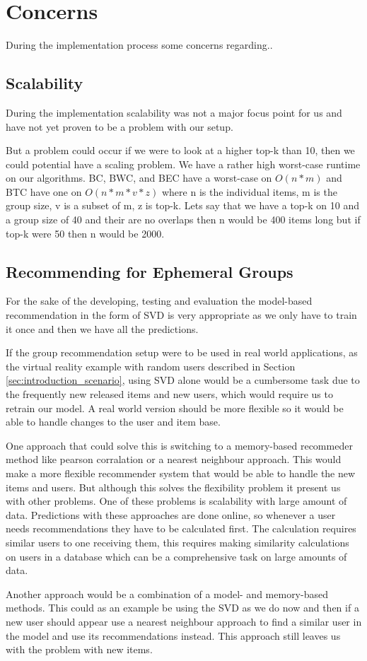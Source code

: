 \section{Concerns}
During the implementation process some concerns regarding..

\subsection{Scalability}
During the implementation scalability was not a major focus point for us and have not yet proven to be a problem with our setup. 

But a problem could occur if we were to look at a higher top-k than 10, then we could potential have a scaling problem. We have a rather high worst-case runtime on our algorithms. BC, BWC, and BEC have a worst-case on $O(n*m)$ and BTC have one on $O(n*m*v*z)$ where n is the individual items, m is the group size, v is a subset of m, z is top-k. Lets say that we have a top-k on 10 and a group size of 40 and their are no overlaps then n would be 400 items long but if top-k were 50 then n would be 2000. 

\subsection{Recommending for Ephemeral Groups}
For the sake of the developing, testing and evaluation the model-based recommendation in the form of SVD is very appropriate as we only have to train it once and then we have all the predictions. 

If the group recommendation setup were to be used in real world applications, as the virtual reality example with random users described in Section \ref{sec:introduction_scenario}, using SVD alone would be a cumbersome task due to the frequently new released items and new users, which would require us to retrain our model. A real world version should be more flexible so it would be able to handle changes to the user and item base. 

One approach that could solve this is switching to a memory-based recommeder method like pearson corralation or a nearest neighbour approach. This would make a more flexible recommender system that would be able to handle the new items and users. But although this solves the flexibility problem it present us with other problems. One of these problems is scalability with large amount of data\cite{DBLP:conf/adaptive/SchaferFHS07}. Predictions with these approaches are done online, so whenever a user needs recommendations they have to be calculated first. The calculation requires similar users to one receiving them, this requires making similarity calculations on users in a database which can be a comprehensive task on large amounts of data.

Another approach would be a combination of a model- and memory-based methods. This could as an example be using the SVD as we do now and then if a new user should appear use a nearest neighbour approach to find a similar user in the model and use its recommendations instead. This approach still leaves us with the problem with new items. 




